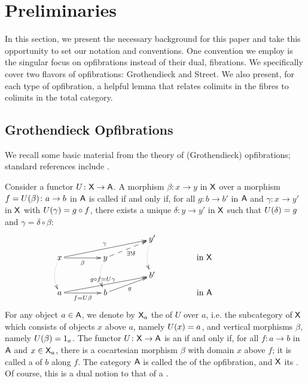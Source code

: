\documentclass{amsart}
\begin{document}




\section{Preliminaries}\label{sec:preliminaries}

In this section, we present the necessary background for this paper
and take this opportunity to set our notation and conventions. One
convention we employ is the singular focus on opfibrations instead of
their dual, fibrations.  We specifically cover two flavors of
opfibrations: Grothendieck and Street.  We also present, for each type
of opfibration, a helpful lemma that relates colimits in the fibres to
colimits in the total category.

\subsection*{Grothendieck Opfibrations}

We recall some basic material from the theory of (Grothendieck) opfibrations; standard references include \cite{Handbook2,Grayfibredandcofibred,hermidaphd}. 

Consider a functor $U \colon\mathsf{X} \to \mathsf{A}$. A morphism $\beta \colon x \to y$ in $\mathsf{X} $ over a morphism $f = U(\beta) \colon a \to b$ in $\mathsf{A}$ is called  if and only if, for all $g \colon b \to b'$ in $\mathsf{A}$ and $\gamma \colon x\to y'$ in $\mathsf{X} $ with $U(\gamma) = g\circ f$, there exists a unique $\delta \colon y\to y'$ in $\mathsf{X}$ such that $U(\delta) = g$ and $\gamma = \delta \circ \beta$:
\begin{equation}\label{eq:opfibration}
\xymatrix @R=.1in @C=.6in
{&& y'\ar @{.>}@/_/[dd] &&\\
x\ar[r]_-{\beta} \ar @{.>}@/_/[dd]
\ar[urr]^-{\gamma} & 
y \ar @{.>}@/_/[dd] \ar @{-->}[ur]_-{\exists! \delta}
&& \textrm{in }\X\\
&& b' &&\\
a\ar[r]_-{f=\U\beta} \ar[urr]^-{g\circ f=\U\gamma}
 & b \ar[ur]_-g && \textrm{in }\A}
\end{equation}
For any object $a\in\mathsf{A}$, we denote by $\mathsf{X}_a$ the  of $U$ over $a$, i.e. the subcategory of $\mathsf{X}$ which consists of objects $x$ above $a$, namely $U(x) = a$, and vertical morphisms $\beta$, namely $U(\beta) = 1_a$. The functor $U \colon \mathsf{X} \to \mathsf{A}$ is an  if and only if, for all $f \colon a \to b$ in $\mathsf{A}$ and $x\in\mathsf{X}_a$, there is a cocartesian morphism $\beta$ with domain $x$ above $f$; it is called a  of $b$ along $f$. The category $\mathsf{A}$ is called the  of the opfibration, and $\mathsf{X} $ its .
Of course, this is a dual notion to that of a .
\end{document}
